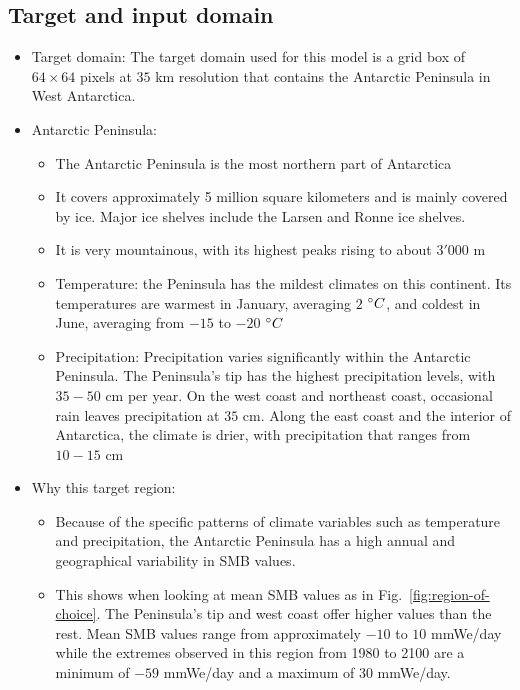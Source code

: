 \documentclass[a4paper,11pt,oneside]{report}
\begin{document}
\subsection{Target and input domain}
\begin{itemize}
   \item Target domain: The target domain used for this model is a grid box of $64 \times 64$ pixels at $35$ \si{km} resolution that contains the Antarctic Peninsula in West Antarctica. 
    \item Antarctic Peninsula: 
    \begin{itemize}
        \item The Antarctic Peninsula is the most northern part of Antarctica
        \item It covers approximately 5 million square kilometers and is mainly covered by ice. Major ice shelves include the Larsen and Ronne ice shelves.
        \item It is very mountainous, with its highest peaks rising to about $3'000$ \si{m}
        \item Temperature: the Peninsula has the mildest climates on this continent. Its temperatures are warmest in January, averaging $2$ $\degree C$, and coldest in June, averaging from $-15$ to $-20$ $\degree C$~\cite{AntarcticPeninsula}
        \item Precipitation: Precipitation varies significantly within the Antarctic Peninsula. The Peninsula's tip has the highest precipitation levels, with $35-50$ \si{cm} per year. On the west coast and northeast coast, occasional rain leaves precipitation at $35$ \si{cm}. Along the east coast and the interior of Antarctica, the climate is drier, with precipitation that ranges from $10-15$ \si{cm}~\cite{antarctic-climate, antarctic-climate-2}
    \end{itemize} 
    \item Why this target region: 
    \begin{itemize}
        \item Because of the specific patterns of climate variables such as temperature and precipitation, the Antarctic Peninsula has a high annual and geographical variability in SMB values. 
        \item This shows when looking at mean SMB values as in Fig.~\ref{fig:region-of-choice}. The Peninsula's tip and west coast offer higher values than the rest. Mean SMB values range from approximately $-10$ to $10$ \si{mmWe/day} while the extremes observed in this region from 1980 to 2100 are a minimum of $-59$ \si{mmWe/day} and a maximum of $30$ \si{mmWe/day}. 

\end{itemize}
\end{itemize}
\end{document}
